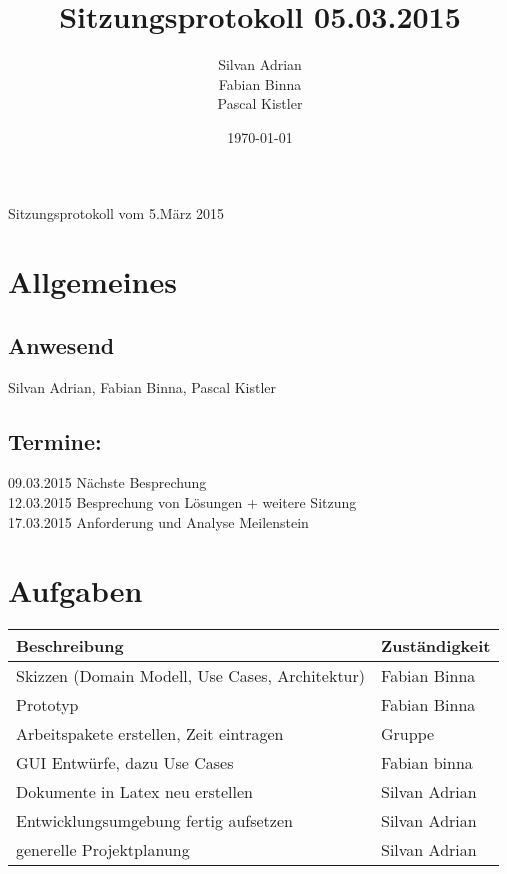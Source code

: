 \documentclass[11pt]{scrartcl}
\title{Sitzungsprotokoll 05.03.2015}
\author{Silvan Adrian \\ Fabian Binna \\ Pascal Kistler}
\date{\today{}}
\begin{document}
{\huge Sitzungsprotokoll vom 5.März 2015}

\section{Allgemeines}
\label{sec:Allgemein}

\subsection{Anwesend}
\label{sec:Anwesend}
Silvan Adrian, Fabian Binna, Pascal Kistler

\subsection{Termine:}
\label{sec:Termine}
09.03.2015 Nächste Besprechung \\
12.03.2015 Besprechung von Lösungen + weitere Sitzung \\
17.03.2015 Anforderung und Analyse Meilenstein
\section{Aufgaben}
\label{sec:Aufgaben}
\begin{table}[h]
\begin{tabularx}{\textwidth}{X l }
\textbf{Beschreibung}  & \textbf{Zuständigkeit} \\
\hline
Skizzen (Domain Modell, Use Cases, Architektur) & Fabian Binna\\
\hline
Prototyp & Fabian Binna \\
\hline
Arbeitspakete erstellen, Zeit eintragen & Gruppe \\
\hline
GUI Entwürfe, dazu Use Cases & Fabian binna \\
\hline
Dokumente in Latex neu erstellen & Silvan Adrian \\
\hline
Entwicklungsumgebung fertig aufsetzen & Silvan Adrian \\
\hline
generelle Projektplanung & Silvan Adrian \\
\end{tabularx}
\end{table}
\end{document}
